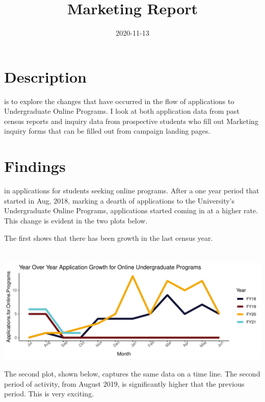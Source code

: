 \documentclass[]{tufte-handout}
\title{Marketing Report}
\date{2020-11-13}
\begin{document}
\maketitle




\hypertarget{description}{%
\section{Description}\label{description}}

 is to explore the changes that
have occurred in the flow of applications to Undergraduate Online
Programs. I look at both application data from past census reports and
inquiry data from prospective students who fill out Marketing inquiry
forms that can be filled out from campaign landing pages.

\hypertarget{findings}{%
\section{Findings}\label{findings}}

 in applications for students seeking
online programs. After a one year period that started in Aug, 2018,
marking a dearth of applications to the University's Undergraduate
Online Programs, applications started coming in at a higher rate. This
change is evident in the two plots below.

The first shows that there has been growth in the last census year.

\hypertarget{section}{%
\section{}\label{section}}

\includegraphics{FY20-Online-Application-Flow-as-of-Census-10-15-2020_files/figure-latex/unnamed-chunk-5-1}

The second plot, shown below, captures the same data on a time line. The
second period of activity, from August 2019, is significantly higher
that the previous period. This is very exciting.
\end{document}
